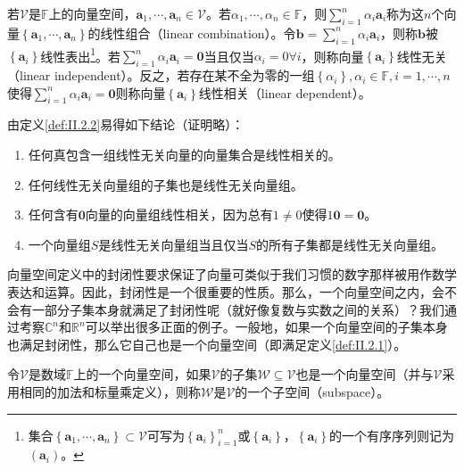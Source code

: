 \documentclass[main.tex]{subfiles}
\begin{document}
\begin{definition}\label{def:II.2.2}
若$\mathcal{V}$是$\mathbb{F}$上的向量空间，$\mathbf{a}_1,\cdots,\mathbf{a}_n\in\mathcal{V}$。若$\alpha_1,\cdots,\alpha_n\in\mathbb{F}$，则$\sum_{i=1}^n\alpha_i\mathbf{a}_i$称为这$n$个向量$\left\{\mathbf{a}_1,\cdots,\mathbf{a}_n\right\}$的线性组合（linear combination）。令$\mathbf{b}=\sum_{i=1}^n\alpha_i\mathbf{a}_i$，则称$\mathbf{b}$被$\left\{\mathbf{a}_i\right\}$线性表出\footnote{集合$\left\{\mathbf{a}_1,\cdots,\mathbf{a}_n\right\}\subset\mathcal{V}$可写为$\left\{\mathbf{a}_i\right\}_{i=1}^n$或$\left\{\mathbf{a}_i\right\}$，$\left\{\mathbf{a}_i\right\}$的一个有序序列则记为$\left(\mathbf{a}_i\right)$。}。若$\sum_{i=1}^n\alpha_i\mathbf{a}_i=\bm{0}$当且仅当$\alpha_i=0\forall i$，则称向量$\left\{\mathbf{a}_i\right\}$线性无关（linear independent）。反之，若存在某不全为零的一组$\left\{\alpha_i\right\},\alpha_i\in\mathbb{F},i=1,\cdots,n$使得$\sum_{i=1}^n\alpha_i\mathbf{a}_i=\bm{0}$则称向量$\left\{\mathbf{a}_i\right\}$线性相关（linear dependent）。
\end{definition}

由定义\ref{def:II.2.2}易得如下结论（证明略）：
\begin{enumerate}
    \item 任何真包含一组线性无关向量的向量集合是线性相关的\cite[定理3.1、3.2, p.~98]{周胜林2012线性代数}。
    \item 任何线性无关向量组的子集也是线性无关向量组\cite[\S7.2“(2)”,p.~171]{周胜林2012线性代数}。
    \item 任何含有$\mathbf{0}$向量的向量组线性相关，因为总有$1\neq 0$使得$1\mathbf{0}=\mathbf{0}$。
    \item 一个向量组$S$是线性无关向量组当且仅当$S$的所有子集都是线性无关向量组。
\end{enumerate}

向量空间定义中的封闭性要求保证了向量可类似于我们习惯的数字那样被用作数学表达和运算。因此，封闭性是一个很重要的性质。那么，一个向量空间之内，会不会有一部分子集本身就满足了封闭性呢（就好像复数与实数之间的关系）？我们通过考察$\mathbb{C}^n$和$\mathbb{R}^n$可以举出很多正面的例子。一般地，如果一个向量空间的子集本身也满足封闭性，那么它自己也是一个向量空间（即满足定义\ref{def:II.2.1}）。

\begin{definition}[子空间]\label{def:II.2.3}
令$\mathcal{V}$是数域$\mathbb{F}$上的一个向量空间，如果$\mathcal{V}$的子集$\mathcal{W}\subseteq\mathcal{V}$也是一个向量空间（并与$\mathcal{V}$采用相同的加法和标量乘定义），则称$\mathcal{W}$是$\mathcal{V}$的一个子空间（subspace）。
\end{definition}
\end{document}
